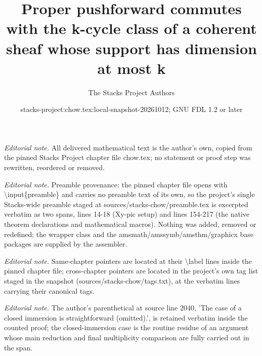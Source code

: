 \documentclass[10pt,a4paper]{amsart}
\title{Proper pushforward commutes with the k-cycle class of a coherent sheaf whose support has dimension at most k}
\author{The Stacks Project Authors}
\date{stacks-project:chow.tex:local-snapshot-20261012; GNU FDL 1.2 or later}
\theoremstyle{plain}
\theoremstyle{definition}
\theoremstyle{remark}
\numberwithin{equation}{subsection}
\begin{document}
\maketitle
\noindent\textit{Editorial note.} All delivered mathematical text is the author's own, copied from the pinned Stacks Project chapter file chow.tex; no statement or proof step was rewritten, reordered or removed.\par\medskip
\noindent\textit{Editorial note.} Preamble provenance: the pinned chapter file opens with \textbackslash{}input\{preamble\} and carries no preamble text of its own, so the project's single Stacks-wide preamble staged at sources/stacks-chow/preamble.tex is excerpted verbatim as two spans, lines 14-18 (Xy-pic setup) and lines 154-217 (the native theorem declarations and mathematical macros). Nothing was added, removed or redefined; the wrapper class and the amsmath/amssymb/amsthm/graphicx base packages are supplied by the assembler.\par\medskip
\noindent\textit{Editorial note.} Same-chapter pointers are located at their \textbackslash{}label lines inside the pinned chapter file; cross-chapter pointers are located in the project's own tag list staged in the snapshot (sources/stacks-chow/tags.txt), at the verbatim lines carrying their canonical tags.\par\medskip
\noindent\textit{Editorial note.} The author's parenthetical at source line 2040, 'The case of a closed immersion is straightforward (omitted).', is retained verbatim inside the counted proof; the closed-immersion case is the routine residue of an argument whose main reduction and final multiplicity comparison are fully carried out in the span.\par\medskip
\end{document}
